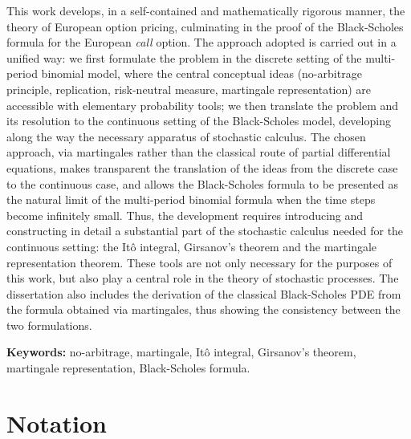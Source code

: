\documentclass[11pt,a4paper,oneside]{report}
\theoremstyle{plain}
\theoremstyle{definition}
\theoremstyle{remark}
\newcommand{\1}{\mathbf{1}}
\begin{document}
\itshape

This work develops, in a self-contained and mathematically rigorous
manner, the theory of European option pricing, culminating in the
proof of the Black-Scholes formula for the European \emph{call}
option. The approach adopted is carried out in a unified way: we
first formulate the problem in the discrete setting of the
multi-period binomial model, where the central conceptual ideas
(no-arbitrage principle, replication, risk-neutral measure,
martingale representation) are accessible with elementary probability
tools; we then translate the problem and its resolution to the
continuous setting of the Black-Scholes model, developing along the
way the necessary apparatus of stochastic calculus. The chosen
approach, via martingales rather than the classical route of partial
differential equations, makes transparent the translation of the
ideas from the discrete case to the continuous case, and allows the
Black-Scholes formula to be presented as the natural limit of the
multi-period binomial formula when the time steps become infinitely
small. Thus, the development requires introducing and constructing in
detail a substantial part of the stochastic calculus needed for the
continuous setting: the Itô integral, Girsanov's theorem and the
martingale representation theorem. These tools are not only necessary
for the purposes of this work, but also play a central role in the
theory of stochastic processes. The dissertation also includes the
derivation of the classical Black-Scholes PDE from the formula
obtained via martingales, thus showing the consistency between the two
formulations.

\upshape

\vspace{0.3cm}
\noindent\textbf{Keywords:} no-arbitrage, martingale, Itô integral,
Girsanov's theorem, martingale representation, Black-Scholes formula.

\setcounter{tocdepth}{2}    %
\tableofcontents

\chapter*{Notation}
\end{document}
